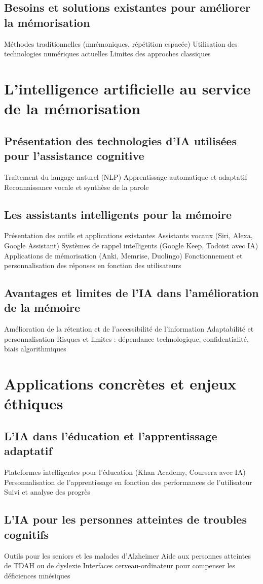 \documentclass[12pt,a4paper]{report}
\begin{document}
\section{Besoins et solutions existantes pour améliorer la mémorisation}
Méthodes traditionnelles (mnémoniques, répétition espacée)
Utilisation des technologies numériques actuelles
Limites des approches classiques
\chapter{L'intelligence artificielle au service de la mémorisation}
\section{Présentation des technologies d'IA utilisées pour l'assistance cognitive}
Traitement du langage naturel (NLP)
Apprentissage automatique et adaptatif
Reconnaissance vocale et synthèse de la parole
\section{Les assistants intelligents pour la mémoire}
Présentation des outils et applications existantes
Assistants vocaux (Siri, Alexa, Google Assistant)
Systèmes de rappel intelligents (Google Keep, Todoist avec IA)
Applications de mémorisation (Anki, Memrise, Duolingo)
Fonctionnement et personnalisation des réponses en fonction des utilisateurs
\section{Avantages et limites de l'IA dans l'amélioration de la mémoire}
Amélioration de la rétention et de l'accessibilité de l'information
Adaptabilité et personnalisation
Risques et limites : dépendance technologique, confidentialité, biais algorithmiques
\chapter{Applications concrètes et enjeux éthiques}
\section{L'IA dans l'éducation et l'apprentissage adaptatif}
Plateformes intelligentes pour l'éducation (Khan Academy, Coursera avec IA)
Personnalisation de l'apprentissage en fonction des performances de l'utilisateur
Suivi et analyse des progrès
\section{L'IA pour les personnes atteintes de troubles cognitifs}
Outils pour les seniors et les malades d'Alzheimer
Aide aux personnes atteintes de TDAH ou de dyslexie
Interfaces cerveau-ordinateur pour compenser les déficiences mnésiques
\end{document}
